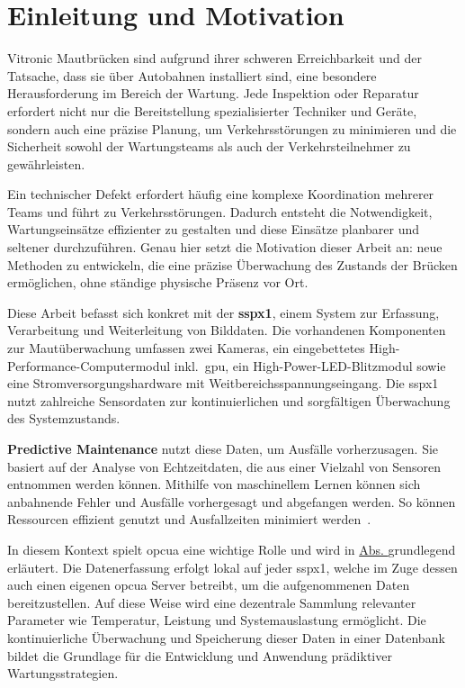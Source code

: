 \chapter{Einleitung und Motivation}
Vitronic Mautbrücken sind aufgrund ihrer schweren Erreichbarkeit und der Tatsache, dass sie über Autobahnen installiert
sind, eine besondere Herausforderung im Bereich der Wartung. Jede Inspektion oder Reparatur erfordert nicht nur die
Bereitstellung spezialisierter Techniker und Geräte, sondern auch eine präzise Planung, um Verkehrsstörungen zu
minimieren und die Sicherheit sowohl der Wartungsteams als auch der Verkehrsteilnehmer zu gewährleisten.

Ein technischer Defekt erfordert häufig eine komplexe Koordination mehrerer Teams und führt zu Verkehrsstörungen. Dadurch
entsteht die Notwendigkeit, Wartungseinsätze effizienter zu gestalten und diese
Einsätze planbarer und seltener durchzuführen. Genau hier setzt die Motivation dieser Arbeit an: neue Methoden zu entwickeln, die
eine präzise Überwachung des Zustands der Brücken ermöglichen, ohne ständige physische Präsenz vor Ort.

Diese Arbeit befasst sich konkret mit der \textbf{\ac{sspx1}}, einem System zur
Erfassung, Verarbeitung und Weiterleitung von Bilddaten. Die vorhandenen Komponenten zur Mautüberwachung umfassen zwei Kameras,
ein eingebettetes High-Performance-Computermodul inkl.~\ac{gpu}, ein High-Power-LED-Blitzmodul sowie
eine Stromversorgungshardware mit Weitbereichsspannungseingang. Die \ac{sspx1} nutzt zahlreiche Sensordaten zur
kontinuierlichen und sorgfältigen Überwachung des Systemzustands.

\textbf{Predictive Maintenance} nutzt diese Daten, um Ausfälle vorherzusagen. Sie basiert auf der Analyse
von Echtzeitdaten, die aus einer Vielzahl von Sensoren entnommen werden können. Mithilfe von maschinellem Lernen können
sich anbahnende Fehler und Ausfälle vorhergesagt und abgefangen werden. So können Ressourcen effizient
genutzt und Ausfallzeiten minimiert werden~\cite[S.~3]{Scheffer2004}.

In diesem Kontext spielt \ac{opcua} eine wichtige Rolle und wird in \hyperref[sec:technologische_grundlagen]{Abs.
} grundlegend erläutert.
Die Datenerfassung erfolgt lokal auf jeder \ac{sspx1}, welche im Zuge dessen auch einen eigenen \ac{opcua} Server betreibt, um die aufgenommenen
Daten bereitzustellen. Auf diese Weise wird eine dezentrale Sammlung relevanter Parameter wie Temperatur,
Leistung und Systemauslastung ermöglicht. Die kontinuierliche Überwachung und Speicherung dieser Daten in einer Datenbank
bildet die Grundlage für die Entwicklung und Anwendung prädiktiver Wartungsstrategien.

